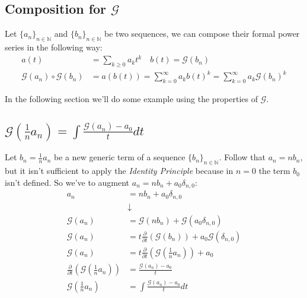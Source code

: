 \subsection{Composition for $\mathcal{G} $}

Let $\{a_n\}_{n\in\mathbb{N} } $ and $\{b_n\}_{n\in\mathbb{N} } $ be
two sequences, we can compose their formal power series in the
following way:
\begin{displaymath}
  \begin{split}
    a(t) &= \sum_{k\geq 0}{a_k t^k} \quad b(t)= \mathcal{G} (b_n) \\
    \mathcal{G} (a_n) \circ \mathcal{G}(b_n) &= a(b(t)) =
    \sum_{k=0}^{\infty}{a_k b(t)^k}=
    \sum_{k=0}^{\infty}{a_k \mathcal{G} (b_n)^k}
  \end{split}
\end{displaymath}

In the following section we'll do some example using the properties of
$\mathcal{G} $.


\subsection{$\mathcal{G} ( \frac{1}{n} a_n) = \int{ \frac{\mathcal{G}
      (a_n) - a_0}{t}dt }$}

Let $b_n = \frac{1}{n} a_n$ be a new generic term of a sequence
$\{b_n\}_{n\in\mathbb{N} } $. Follow that $a_n = n b_n$, but it isn't
sufficient to apply the \emph{Identity Principle} because in $n=0$ the
term $b_0$ isn't defined. So we've to augment $a_n = n b_n +
a_0\delta_{n,0}$:
\begin{displaymath}
  \begin{split}
    a_n &= n b_n + a_0\delta_{n,0} \\
    &\downarrow \\
    \mathcal{G} (a_n) &= \mathcal{G} (n b_n) + \mathcal{G}
    (a_0\delta_{n,0})\\
    \mathcal{G} (a_n) &= t \frac{\partial}{\partial t}\left(
      \mathcal{G} ( b_n) \right) + a_0\mathcal{G} (\delta_{n,0})\\
    \mathcal{G} (a_n) &= t \frac{\partial}{\partial t}\left(
      \mathcal{G} ( \frac{1}{n} a_n) \right) + a_0\\
    \frac{\partial}{\partial t}\left( \mathcal{G} ( \frac{1}{n} a_n)
    \right) &= \frac{\mathcal{G} (a_n) - a_0}{t}\\
    \mathcal{G} ( \frac{1}{n} a_n) &=\int{ \frac{\mathcal{G} (a_n) -
        a_0}{t}dt}
  \end{split}
\end{displaymath}

